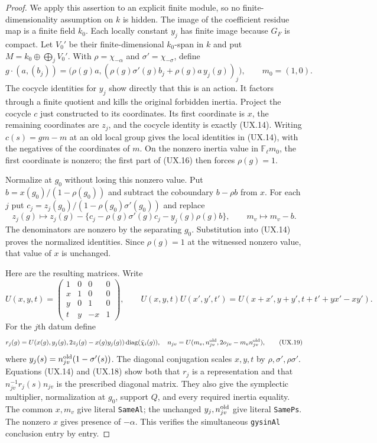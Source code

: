 \begin{proof}
We apply this assertion to an explicit finite module,
so no finite-dimensionality assumption on $k$ is hidden.
The image of the coefficient residue map is a finite
field $k_0$.  Each locally constant $y_j$ has finite
image because $G_F$ is compact.  Let $V_0'$ be their
finite-dimensional $k_0$-span in $k$ and put
$M=k_0\oplus\bigoplus_j V_0'$.  With
$\rho=\chi_{-\alpha}$ and $\sigma'=\chi_{-\sigma}$,
define
\[
 g\cdot(a,(b_j))=
  \bigl(\rho(g)a,
    (\rho(g)\sigma'(g)b_j+\rho(g)a\,y_j(g))_j\bigr),
 \qquad m_0=(1,0).
 \tag{UX.16}
\]
The cocycle identities for $y_j$ show directly that
this is an action.  It factors through a finite quotient
and kills the original forbidden inertia.  Project the
cocycle $c$ just constructed to its coordinates.  Its
first coordinate is $x$, the remaining coordinates are
$z_j$, and the cocycle identity is exactly (UX.14).
Writing $c(s)=g m-m$ at an old local group gives the
local identities in (UX.14), with the negatives of
the coordinates of $m$.  On the nonzero inertia value
in $\mathbb F_\ell m_0$, the first coordinate is
nonzero; the first part of (UX.16) then forces
$\rho(g)=1$.

Normalize at $g_0$ without losing this nonzero value.
Put $b=x(g_0)/(1-\rho(g_0))$ and subtract the
coboundary $b-\rho b$ from $x$.  For each $j$ put
$c_j=z_j(g_0)/(1-\rho(g_0)\sigma'(g_0))$ and replace
\[
 z_j(g)\longmapsto z_j(g)-
 \{c_j-\rho(g)\sigma'(g)c_j-y_j(g)\rho(g)b\},
 \qquad m_v\longmapsto m_v-b.
 \tag{UX.17}
\]
The denominators are nonzero by the separating $g_0$.
Substitution into (UX.14) proves the normalized
identities.  Since $\rho(g)=1$ at the witnessed
nonzero value, that value of $x$ is unchanged.

Here are the resulting matrices.  Write
\[
 U(x,y,t)=
 \begin{pmatrix}
 1&0&0&0\\x&1&0&0\\y&0&1&0\\t&y&-x&1
 \end{pmatrix},\qquad
 U(x,y,t)U(x',y',t')
 =U(x+x',y+y',t+t'+yx'-xy').
 \tag{UX.18}
\]
For the $j$th datum define
\[
 r_j(g)=U(x(g),y_j(g),2z_j(g)-x(g)y_j(g))
                         \operatorname{diag}(\bar\chi_i(g)),
 \quad
 n_{jv}=U(m_v,n_{jv}^{\rm old},2o_{jv}-m_vn_{jv}^{\rm old}),
 \tag{UX.19}
\]
where $y_j(s)=n_{jv}^{\rm old}
(1-\sigma'(s))$.  The diagonal conjugation scales
$x,y,t$ by $\rho,\sigma',\rho\sigma'$.
Equations (UX.14) and (UX.18) show both that $r_j$ is
a representation and that $n_{jv}^{-1}r_j(s)n_{jv}$
is the prescribed diagonal matrix.  They also give
the symplectic multiplier, normalization at $g_0$,
support $Q$, and every required inertia equality.
The common $x,m_v$ give literal \texttt{SameAl}; the
unchanged $y_j,n_{jv}^{\rm old}$ give literal
\texttt{SamePs}.  The nonzero $x$ gives presence of
$-\alpha$.  This verifies the simultaneous
\texttt{gysinAl} conclusion entry by entry.


\end{proof}
